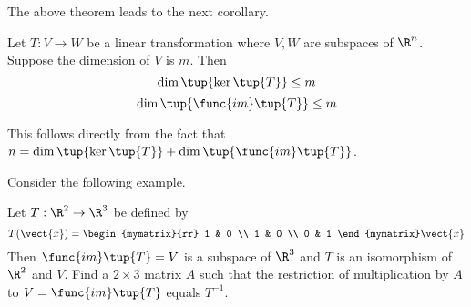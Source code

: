The above theorem leads to the next corollary.

\begin{corollary}{}{}
Let $T:V\rightarrow W$ be a linear transformation where $V,W$ are subspaces of $\R^n$. Suppose the dimension of $V$ is $m$. Then 
\[
\dim \tup{\ker \tup{T} } \leq m
\]
\[
\dim \tup{\func{im}\tup{T } } \leq m
\]
\end{corollary}

This follows directly from the fact that $n=\dim \tup{\ker \tup{T} } +\dim \tup{\func{im}\tup{
T} } $.

Consider the following example.

\begin{example}{}{}
Let $T:\R^{2}\rightarrow \R^{3}$ be defined by 
\begin{equation*}
T(\vect{x})=\begin{mymatrix}{rr}
1 & 0 \\ 
1 & 0 \\ 
0 & 1
\end{mymatrix} \vect{x}
\end{equation*}
Then $\func{im}\tup{T} =V$ is a subspace of $\R^{3}$ and $T$
is an isomorphism of $\R^{2}$ and $V$. Find a $2\times 3$ matrix $A$
such that the restriction of multiplication by $A$ to $V=\func{im}\tup{
T} $ equals $T^{-1}$. 
\end{example}

